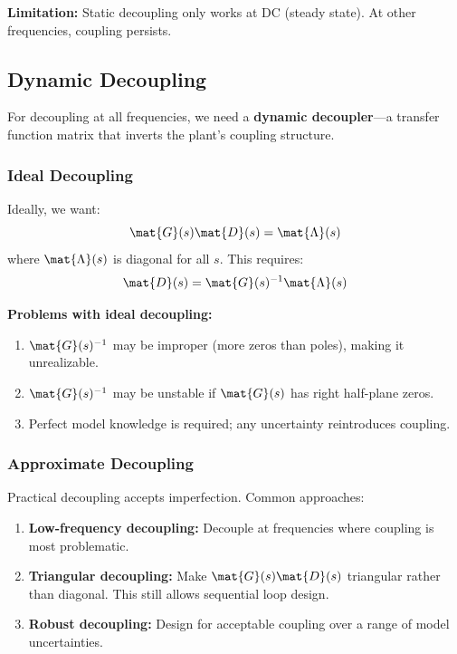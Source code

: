 \textbf{Limitation:} Static decoupling only works at DC (steady state). At other frequencies, coupling persists.

\subsection{Dynamic Decoupling}

For decoupling at all frequencies, we need a \textbf{dynamic decoupler}---a transfer function matrix that inverts the plant's coupling structure.

\subsubsection{Ideal Decoupling}

Ideally, we want:
\begin{equation}
\mat{G}(s)\mat{D}(s) = \mat{\Lambda}(s)
\end{equation}
where $\mat{\Lambda}(s)$ is diagonal for all $s$. This requires:
\begin{equation}
\mat{D}(s) = \mat{G}(s)^{-1}\mat{\Lambda}(s)
\label{eq:ideal_decoupler}
\end{equation}

\textbf{Problems with ideal decoupling:}
\begin{enumerate}
    \item $\mat{G}(s)^{-1}$ may be improper (more zeros than poles), making it unrealizable.
    \item $\mat{G}(s)^{-1}$ may be unstable if $\mat{G}(s)$ has right half-plane zeros.
    \item Perfect model knowledge is required; any uncertainty reintroduces coupling.
\end{enumerate}

\subsubsection{Approximate Decoupling}

Practical decoupling accepts imperfection. Common approaches:

\begin{enumerate}
    \item \textbf{Low-frequency decoupling:} Decouple at frequencies where coupling is most problematic.

    \item \textbf{Triangular decoupling:} Make $\mat{G}(s)\mat{D}(s)$ triangular rather than diagonal. This still allows sequential loop design.

    \item \textbf{Robust decoupling:} Design for acceptable coupling over a range of model uncertainties.
\end{enumerate}

